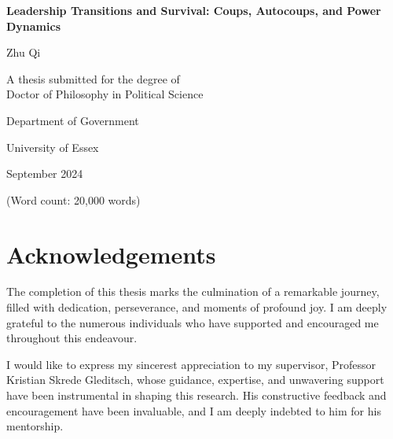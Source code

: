 \documentclass[
  12pt,
]{report}
\author{}
\date{}
\renewcommand*\contentsname{Table of contents}
\newcommand\contentsname{Table of contents}
\begin{document}
\begin{titlepage}
  \begin{center}
    \vspace*{2cm}
    
    \Huge{\textbf{Leadership Transitions and Survival: Coups, Autocoups, and Power Dynamics}}
    
    \vspace{1.5cm}
    
    \Large{Zhu Qi}
    
    \vspace{5cm}
    
    \large{A thesis submitted for the degree of \\ Doctor of Philosophy in Political Science}
    
    \vspace{0.8cm}
    
    \large{Department of Government}
    \vspace{0.5cm}
    
    \large{University of Essex}
    
    \vspace{1.5cm}
    
    \large{September 2024}
    \vspace{2cm}
    
    \large{(Word count: 20,000 words)}
    
  \end{center}
\end{titlepage}

\renewcommand*\contentsname{Contents}
{
\hypersetup{linkcolor=}
\setcounter{tocdepth}{2}
\tableofcontents
}
\listoffigures
\listoftables

\chapter*{Acknowledgements}\label{acknowledgements}

The completion of this thesis marks the culmination of a remarkable
journey, filled with dedication, perseverance, and moments of profound
joy. I am deeply grateful to the numerous individuals who have supported
and encouraged me throughout this endeavour.

I would like to express my sincerest appreciation to my supervisor,
Professor Kristian Skrede Gleditsch, whose guidance, expertise, and
unwavering support have been instrumental in shaping this research. His
constructive feedback and encouragement have been invaluable, and I am
deeply indebted to him for his mentorship.
\end{document}
